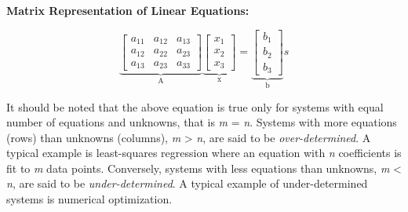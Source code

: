 \documentclass[book.tex]{subfiles}
\begin{document}
\begin{margintable}
	\textbf{Matrix Representation of Linear Equations:}
	\\
	\vspace{20pt}

\[	
	\underbrace{
	\begin{bmatrix}
	a_{11} & a_{12} & a_{13} \\
	a_{12} & a_{22} & a_{23} \\
	a_{13} & a_{23} & a_{33}
	\end{bmatrix}}_{\text{A}}
	\underbrace{
	\begin{bmatrix}
			x_{1}\\
			x_{2}\\
			x_{3}
	\end{bmatrix}}_{\text{x}} = 
	\underbrace{
	\begin{bmatrix}
	b_{1}\\
	b_{2}\\
	b_{3}
	\end{bmatrix}}_{\text{b}}s
\]
		
	
\end{margintable}

It should be noted that the above equation is true only for systems with equal number of equations and unknowns, that is \textit{m} = \textit{n}. Systems with more equations (rows) than unknowns (columns), \textit{m} > \textit{n}, are said to be \textit{over-determined}. A typical example is least-squares regression where an equation with \textit{n} coefficients is fit to \textit{m} data points. Conversely, systems with less equations than unknowns, \textit{m} < \textit{n}, are said to be \textit{under-determined}. A typical example of under-determined systems is numerical optimization.


\end{document}
